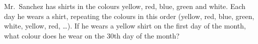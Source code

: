 Mr.~Sanchez has shirts in the colours yellow, red, blue, green and white. Each day he wears a shirt, repeating the colours in this order (yellow, red, blue, green, white, yellow, red, \ldots). If he wears a yellow shirt on the first day of the month, what colour does he wear on the $30$th day of the month?

